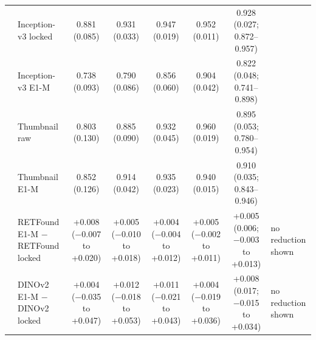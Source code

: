 \begin{longtable}{@{}llcccccp{3cm}@{}}
 & Inception-v3 locked & \makecell{0.881\\{\scriptsize (0.085)}} & \makecell{0.931\\{\scriptsize (0.033)}} & \makecell{0.947\\{\scriptsize (0.019)}} & \makecell{0.952\\{\scriptsize (0.011)}} & \makecell{0.928\\{\scriptsize (0.027; 0.872--0.957)}} &  \\
 & Inception-v3 E1-M & \makecell{0.738\\{\scriptsize (0.093)}} & \makecell{0.790\\{\scriptsize (0.086)}} & \makecell{0.856\\{\scriptsize (0.060)}} & \makecell{0.904\\{\scriptsize (0.042)}} & \makecell{0.822\\{\scriptsize (0.048; 0.741--0.898)}} &  \\
 & Thumbnail raw & \makecell{0.803\\{\scriptsize (0.130)}} & \makecell{0.885\\{\scriptsize (0.090)}} & \makecell{0.932\\{\scriptsize (0.045)}} & \makecell{0.960\\{\scriptsize (0.019)}} & \makecell{0.895\\{\scriptsize (0.053; 0.780--0.954)}} &  \\
 & Thumbnail E1-M & \makecell{0.852\\{\scriptsize (0.126)}} & \makecell{0.914\\{\scriptsize (0.042)}} & \makecell{0.935\\{\scriptsize (0.023)}} & \makecell{0.940\\{\scriptsize (0.015)}} & \makecell{0.910\\{\scriptsize (0.035; 0.843--0.946)}} &  \\
 & RETFound E1-M $-$ RETFound locked & \makecell{+0.008\\{\scriptsize ($-$0.007 to +0.020)}} & \makecell{+0.005\\{\scriptsize ($-$0.010 to +0.018)}} & \makecell{+0.004\\{\scriptsize ($-$0.004 to +0.012)}} & \makecell{+0.005\\{\scriptsize ($-$0.002 to +0.011)}} & \makecell{+0.005\\{\scriptsize (0.006; $-$0.003 to +0.013)}} & no reduction shown \\
 & DINOv2 E1-M $-$ DINOv2 locked & \makecell{+0.004\\{\scriptsize ($-$0.035 to +0.047)}} & \makecell{+0.012\\{\scriptsize ($-$0.018 to +0.053)}} & \makecell{+0.011\\{\scriptsize ($-$0.021 to +0.043)}} & \makecell{+0.004\\{\scriptsize ($-$0.019 to +0.036)}} & \makecell{+0.008\\{\scriptsize (0.017; $-$0.015 to +0.034)}} & no reduction shown \\

\end{longtable}
